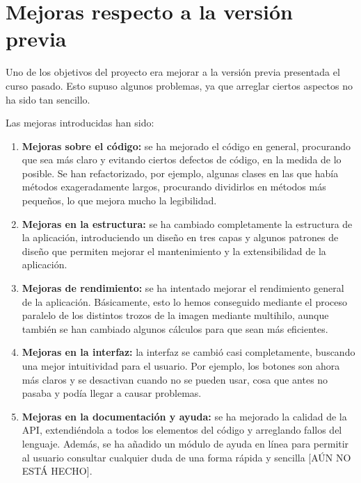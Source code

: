 


\section{Mejoras respecto a la versión previa}
Uno de los objetivos del proyecto era mejorar a la versión previa presentada el curso pasado. Esto supuso algunos problemas, ya que arreglar ciertos aspectos no ha sido tan sencillo.

Las mejoras introducidas han sido:

\begin{enumerate}

\item \textbf{Mejoras sobre el código:} se ha mejorado el código en general, procurando que sea más claro y evitando ciertos defectos de código, en la medida de lo posible. Se han refactorizado, por ejemplo, algunas clases en las que había métodos exageradamente largos, procurando dividirlos en métodos más pequeños, lo que mejora mucho la legibilidad.

\item \textbf{Mejoras en la estructura:} se ha cambiado completamente la estructura de la aplicación, introduciendo un diseño en tres capas y algunos patrones de diseño que permiten mejorar el mantenimiento y la extensibilidad de la aplicación.

\item \textbf{Mejoras de rendimiento:} se ha intentado mejorar el rendimiento general de la aplicación. Básicamente, esto lo hemos conseguido mediante el proceso paralelo de los distintos trozos de la imagen mediante multihilo, aunque también se han cambiado algunos cálculos para que sean más eficientes.

\item \textbf{Mejoras en la interfaz:} la interfaz se cambió casi completamente, buscando una mejor intuitividad para el usuario. Por ejemplo, los botones son ahora más claros y se desactivan cuando no se pueden usar, cosa que antes no pasaba y podía llegar a causar problemas.

\item \textbf{Mejoras en la documentación y ayuda:} se ha mejorado la calidad de la API, extendiéndola a todos los elementos del código y arreglando fallos del lenguaje. Además, se ha añadido un módulo de ayuda en línea para permitir al usuario consultar cualquier duda de una forma rápida y sencilla [AÚN NO ESTÁ HECHO].


\end{enumerate}
